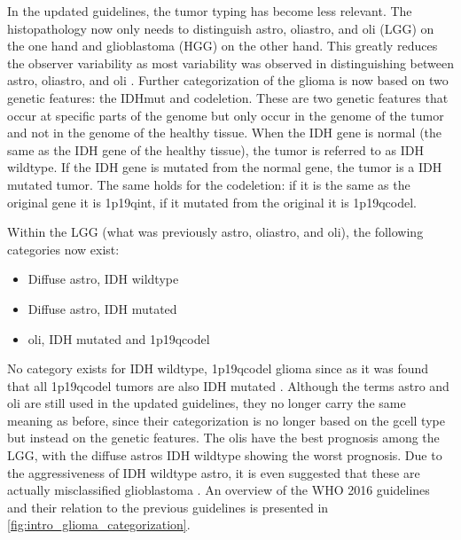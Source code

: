 In the updated guidelines, the \gls{tumor} typing has become less relevant.
The histopathology now only needs to distinguish \gls{astro}, \gls{oliastro}, and \gls{oli} (\gls{LGG}) on the one hand and \gls{glioblastoma} (\gls{HGG}) on the other hand.
This greatly reduces the observer variability as most variability was observed in distinguishing between \gls{astro}, \gls{oliastro}, and \gls{oli} \autocite{mittler1996gradingreliability}.
Further categorization of the \gls{glioma} is now based on two genetic features:  the \gls{IDHmut} and \gls{codeletion}.
These are two genetic features that occur at specific parts of the genome but only occur in the genome of the \gls{tumor} and not in the genome of the healthy tissue.
When the \gls{IDH} gene is normal (the same as the \gls{IDH} gene of the healthy tissue), the \gls{tumor} is referred to as \gls{IDH} wildtype.
If the \gls{IDH} gene is mutated from the normal gene, the \gls{tumor} is a \gls{IDH} mutated \gls{tumor}.
The same holds for the \gls{codeletion}: if it is the same as the original gene it is \acl{1p19qint}, if it mutated from the original it is \acl{1p19qcodel}.

Within the \gls{LGG} (what was previously \gls{astro}, \gls{oliastro}, and \gls{oli}), the following categories now exist:
\begin{itemize}
    \item Diffuse \gls{astro}, \gls{IDH} wildtype
    \item Diffuse \gls{astro}, \gls{IDH} mutated
    \item \Gls{oli}, \gls{IDH} mutated and \acl{1p19qcodel}
\end{itemize}
No category exists for \gls{IDH} wildtype, \acl{1p19qcodel} \gls{glioma} since as it was found that all \acl{1p19qcodel} \glspl{tumor} are also \gls{IDH} mutated \autocite{labussi20101p19qcodeletedIDH}.
Although the terms \gls{astro} and \gls{oli} are still used in the updated guidelines, they no longer carry the same meaning as before, since their categorization is no longer based on the \gls{gcell} type but instead on the genetic features.
The \glspl{oli} have the best prognosis among the \gls{LGG}, with the diffuse \glspl{astro} \gls{IDH} wildtype showing the worst prognosis.
Due to the aggressiveness of \gls{IDH} wildtype \gls{astro}, it is even suggested that these are actually misclassified \gls{glioblastoma} \autocite{hartmann2010IDH1gbm, brat2018IMPACT}.
An overview of the \gls{WHO} 2016 guidelines and their relation to the previous guidelines is presented in \cref{fig:intro_glioma_categorization}.


